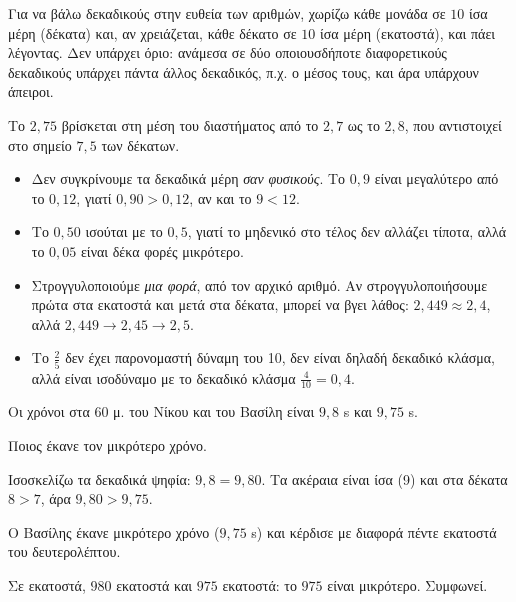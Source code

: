 
Για να βάλω δεκαδικούς στην ευθεία των αριθμών, χωρίζω κάθε μονάδα σε $10$ ίσα μέρη (δέκατα) και, αν χρειάζεται, κάθε δέκατο σε $10$ ίσα μέρη (εκατοστά), και πάει λέγοντας. Δεν υπάρχει όριο: ανάμεσα σε δύο οποιουσδήποτε διαφορετικούς δεκαδικούς υπάρχει πάντα άλλος δεκαδικός, π.χ. ο μέσος τους, και άρα υπάρχουν άπειροι.

\begin{center}
\end{center}

Το $2{,}75$ βρίσκεται στη μέση του διαστήματος από το $2{,}7$ ως το $2{,}8$, που αντιστοιχεί στο σημείο $7{,}5$ των δέκατων.

\begin{prosoxi}
\begin{itemize}[leftmargin=1.2em,itemsep=0.3ex,topsep=2pt]
\item Δεν συγκρίνουμε τα δεκαδικά μέρη \emph{σαν φυσικούς}. Το $0{,}9$ είναι μεγαλύτερο από το $0{,}12$, γιατί $0{,}90>0{,}12$, αν και το $9<12$.
\item Το $0{,}50$ ισούται με το $0{,}5$, γιατί το μηδενικό στο τέλος δεν αλλάζει τίποτα, αλλά το $0{,}05$ είναι δέκα φορές μικρότερο.
\item Στρογγυλοποιούμε \emph{μια φορά}, από τον αρχικό αριθμό. Αν στρογγυλοποιήσουμε πρώτα στα εκατοστά και μετά στα δέκατα, μπορεί να βγει λάθος: $2{,}449\approx2{,}4$, αλλά $2{,}449\to2{,}45\to2{,}5$.
\item Το $\frac{2}{5}$ δεν έχει παρονομαστή δύναμη του 10, δεν είναι δηλαδή δεκαδικό κλάσμα, αλλά είναι ισοδύναμο με το δεκαδικό κλάσμα $\frac{4}{10}=0{,}4$.
\end{itemize}
\end{prosoxi}


\tixero Οι χρόνοι στα 60 μ. του Νίκου και του Βασίλη είναι $9{,}8$ s και $9{,}75$ s.\par
\tithelo Ποιος έκανε τον μικρότερο χρόνο.\par
\possindeo Ισοσκελίζω τα δεκαδικά ψηφία: $9{,}8=9{,}80$. Τα ακέραια είναι ίσα (9) και στα δέκατα $8>7$, άρα $9{,}80>9{,}75$.\par
\apantisi Ο Βασίλης έκανε μικρότερο χρόνο ($9{,}75$ s) και κέρδισε με διαφορά πέντε εκατοστά του δευτερολέπτου.\par
\elegxos Σε εκατοστά, $980$ εκατοστά και $975$ εκατοστά: το $975$ είναι μικρότερο. Συμφωνεί.

